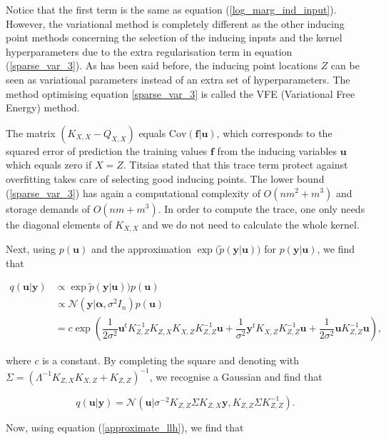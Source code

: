 \documentclass[12pt,a4paper,oneside]{book}
\begin{document}
Notice that the first term is the same as equation (\ref{log_marg_ind_input}). However, the variational method is completely different as the other inducing point methods concerning the selection of the inducing inputs and the kernel hyperparameters due to the extra regularisation term in equation (\ref{sparse_var_3}). As has been said before, the inducing point locations $Z$ can be seen as variational parameters instead of an extra set of hyperparameters. The method optimising equation \ref{sparse_var_3} is called the VFE (Variational Free Energy) method.

The matrix $(K_{X,X} - Q_{X,X})$ equals $\text{Cov}(\bm{f}|\bm{u})$, which corresponds to the squared error of prediction the training values $\bm{f}$ from the inducing variables $\bm{u}$ which equals zero if $X=Z$. Titsias stated that this trace term protect against overfitting takes care of selecting good inducing points. The lower bound (\ref{sparse_var_3}) has again a computational complexity of $O(nm^2 + m^3)$ and storage demands of $O(nm + m^3)$. In order to compute the trace, one only needs the diagonal elements of $K_{X,X}$ and we do not need to calculate the whole kernel. 

Next, using $p(\bm{u})$ and the approximation $\exp{( \tilde{p}(\bm{y}|\bm{u})})$ for $p(\bm{y}|\bm{u})$, we find that

\begin{align}\label{marg_on_u}
q(\bm{u}|\bm{y}) &\propto \exp{ \tilde{p}(\bm{y}|\bm{u})) p(\bm{u})  }\nonumber \\
&\propto \mathcal{N}(\bm{y} | \bm{\alpha}, \sigma^2 I_n)  p(\bm{u}) \nonumber \\
&= c \exp{ \left( \dfrac{1}{2\sigma^2} \bm{u}^t K_{Z,Z}^{-1} K_{Z,X} K_{X,Z} K_{Z,Z}^{-1} \bm{u} + \dfrac{1}{\sigma^2} \bm{y}^t K_{X,Z} K_{Z,Z}^{-1} \bm{u} + \dfrac{1}{2\sigma^2} \bm{u} K_{Z,Z}^{-1} \bm{u} \right) },
\end{align}

where $c$ is a constant. By completing the square and denoting with $\Sigma = (\Lambda^{-1} K_{Z,X}K_{X,Z} + K_{Z,Z})^{-1}$, we recognise a Gaussian and find that

\begin{equation}\label{optimal_q}
q(\bm{u}|\bm{y}) =  \mathcal{N} (\bm{u}|\sigma^{-2} K_{Z,Z} \Sigma K_{Z,X} \bm{y}, K_{Z,Z}\Sigma K_{Z,Z}^{-1}).
\end{equation}

Now, using equation (\ref{approximate_llh}), we find that 
\end{document}

